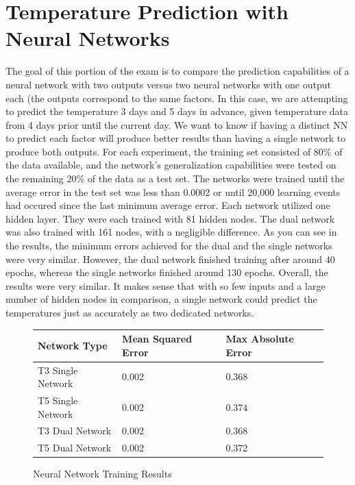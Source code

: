\documentclass[12pt,fleqn]{article}
\begin{document}
\section{Temperature Prediction with Neural Networks}
The goal of this portion of the exam is to compare the prediction capabilities of a neural
network with two outputs versus two neural networks with one output each (the outputs
correspond to the same factors.  In this case, we are attempting to predict the
temperature 3 days and 5 days in advance, given temperature data from 4 days prior until
the current day.  We want to know if having a distinct NN to predict each factor will
produce better results than having a single network to produce both outputs. For each 
experiment, the training set consisted of 80\% of the data available, and the network's
generalization capabilities were tested on the remaining 20\% of the data as a test
set. The networks were trained until the average error in the test set was less than 0.0002 or until 20,000 learning events had occured since the last minimum average error. Each network utilized one hidden layer.  They were each trained with 81 hidden nodes.  The dual network was also trained with 161 nodes, with a negligible difference.  As you can see in the results, the minimum errors achieved for the dual and the single networks were
very similar.  However, the dual network finished training after around 40 epochs, whereas
the single networks finished around 130 epochs.  Overall, the results were very similar. It makes sense that with so few inputs and a large number of hidden nodes in comparison,
a single network could predict the temperatures just as accurately as two dedicated networks.

\begin{figure}
{\small
\begin{center}
    \begin{tabular}{ | l | l | l | }
        \hline
        Network Type &  Mean Squared Error & Max Absolute Error \\ \hline
        T3 Single Network & 0.002 & 0.368 \\ \hline
        T5 Single Network & 0.002 & 0.374 \\ \hline
        T3 Dual Network & 0.002  & 0.368 \\ \hline
        T5 Dual Network & 0.002  & 0.372 \\ \hline
    \end{tabular}
\end{center}
}
\caption{Neural Network Training Results}
\label{fig:psoResults}
\end{figure}
\end{document}
